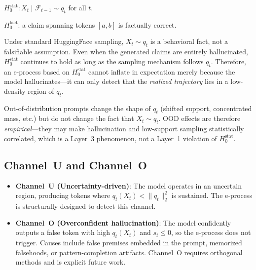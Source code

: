 \documentclass[runningheads]{llncs}
\newcommand{\Hnull}{H_0^{\text{stat}}}
\begin{document}
\begin{definition}
$\Hnull: X_t \mid \mathcal{F}_{t-1} \sim q_t$ for all $t$.
\end{definition}

\begin{definition}
$H_0^{\text{fact}}$: a claim spanning tokens $[a, b]$ is factually correct.
\end{definition}

\begin{remark}
Under standard HuggingFace sampling, $X_t \sim q_t$ is a behavioral fact, not
a falsifiable assumption. Even when the generated claims are entirely
hallucinated, $\Hnull$ continues to hold as long as the sampling mechanism
follows $q_t$. Therefore, an e-process based on $\Hnull$ cannot inflate in
expectation merely because the model hallucinates---it can only detect that
the \textit{realized trajectory} lies in a low-density region of $q_t$.
\end{remark}

\begin{remark}
Out-of-distribution prompts change the shape of $q_t$ (shifted support,
concentrated mass, etc.) but do not change the fact that $X_t \sim q_t$.
OOD effects are therefore \textit{empirical}---they may make hallucination
and low-support sampling statistically correlated, which is a Layer~3
phenomenon, not a Layer~1 violation of $\Hnull$.
\end{remark}

\subsection{Channel~U and Channel~O}
\label{sec:channels}

\begin{itemize}
    \item \textbf{Channel~U (Uncertainty-driven)}: The model operates in an
          uncertain region, producing tokens where
          $q_t(X_t) < \|q_t\|_2^2$ is sustained. The e-process is structurally
          designed to detect this channel.
    \item \textbf{Channel~O (Overconfident hallucination)}: The model
          confidently outputs a false token with high $q_t(X_t)$ and
          $s_t \le 0$, so the e-process does not trigger. Causes include
          false premises embedded in the prompt, memorized falsehoods, or
          pattern-completion artifacts. Channel~O requires orthogonal methods
          and is explicit future work.
\end{itemize}
\end{document}
